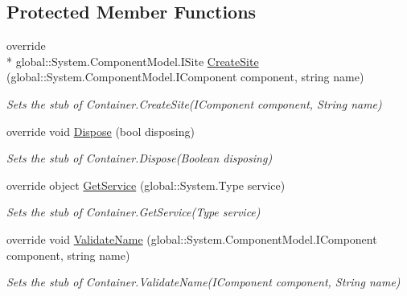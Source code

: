 \subsection*{Protected Member Functions}
\begin{DoxyCompactItemize}
\item 
override \\*
global\-::\-System.\-Component\-Model.\-I\-Site \hyperlink{class_system_1_1_component_model_1_1_fakes_1_1_stub_container_add4ac0c37f2c1cdb8bdebe6883e9eb6c}{Create\-Site} (global\-::\-System.\-Component\-Model.\-I\-Component component, string name)
\begin{DoxyCompactList}\small\item\em Sets the stub of Container.\-Create\-Site(\-I\-Component component, String name)\end{DoxyCompactList}\item 
override void \hyperlink{class_system_1_1_component_model_1_1_fakes_1_1_stub_container_a12e1fa2bc5bad50ee3c477b1544aa761}{Dispose} (bool disposing)
\begin{DoxyCompactList}\small\item\em Sets the stub of Container.\-Dispose(\-Boolean disposing)\end{DoxyCompactList}\item 
override object \hyperlink{class_system_1_1_component_model_1_1_fakes_1_1_stub_container_ac4ff7510bd2e88142b09d2a15af8ede2}{Get\-Service} (global\-::\-System.\-Type service)
\begin{DoxyCompactList}\small\item\em Sets the stub of Container.\-Get\-Service(\-Type service)\end{DoxyCompactList}\item 
override void \hyperlink{class_system_1_1_component_model_1_1_fakes_1_1_stub_container_af9b3adb3fdabc210bc625c63c4910963}{Validate\-Name} (global\-::\-System.\-Component\-Model.\-I\-Component component, string name)
\begin{DoxyCompactList}\small\item\em Sets the stub of Container.\-Validate\-Name(\-I\-Component component, String name)\end{DoxyCompactList}\end{DoxyCompactItemize}
